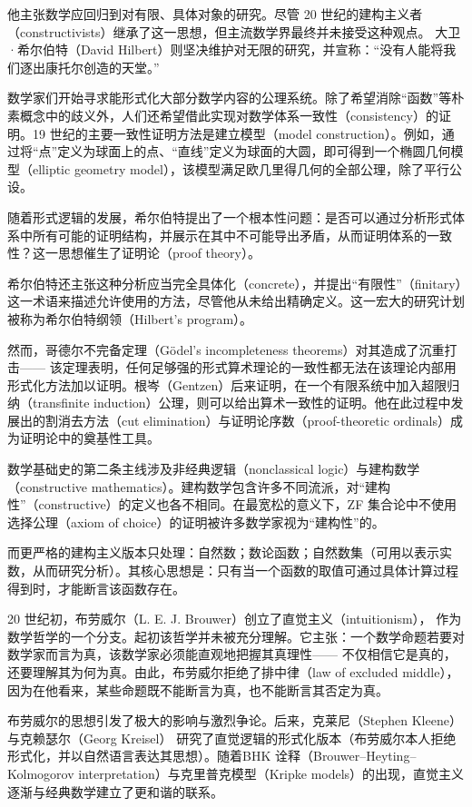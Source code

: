 他主张数学应回归到对有限、具体对象的研究。尽管 20 世纪的建构主义者（constructivists）继承了这一思想，但主流数学界最终并未接受这种观点。  
大卫·希尔伯特（David Hilbert）则坚决维护对无限的研究，并宣称：“没有人能将我们逐出康托尔创造的天堂。”

数学家们开始寻求能形式化大部分数学内容的公理系统。除了希望消除“函数”等朴素概念中的歧义外，人们还希望借此实现对数学体系一致性（consistency）的证明。19 世纪的主要一致性证明方法是建立模型（model construction）。例如，通过将“点”定义为球面上的点、“直线”定义为球面的大圆，即可得到一个椭圆几何模型（elliptic geometry model），该模型满足欧几里得几何的全部公理，除了平行公设。

随着形式逻辑的发展，希尔伯特提出了一个根本性问题：是否可以通过分析形式体系中所有可能的证明结构，并展示在其中不可能导出矛盾，从而证明体系的一致性？这一思想催生了证明论（proof theory）。  

希尔伯特还主张这种分析应当完全具体化（concrete），并提出“有限性”（finitary）这一术语来描述允许使用的方法，尽管他从未给出精确定义。这一宏大的研究计划被称为希尔伯特纲领（Hilbert’s program）。  

然而，哥德尔不完备定理（Gödel’s incompleteness theorems）对其造成了沉重打击—— 该定理表明，任何足够强的形式算术理论的一致性都无法在该理论内部用形式化方法加以证明。根岑（Gentzen）后来证明，在一个有限系统中加入超限归纳（transfinite induction）公理，则可以给出算术一致性的证明。他在此过程中发展出的割消去方法（cut elimination）与证明论序数（proof-theoretic ordinals）成为证明论中的奠基性工具。

数学基础史的第二条主线涉及非经典逻辑（nonclassical logic）与建构数学（constructive mathematics）。建构数学包含许多不同流派，对“建构性”（constructive）的定义也各不相同。在最宽松的意义下，ZF 集合论中不使用选择公理（axiom of choice）的证明被许多数学家视为“建构性”的。  

而更严格的建构主义版本只处理：自然数；数论函数；自然数集（可用以表示实数，从而研究分析）。其核心思想是：只有当一个函数的取值可通过具体计算过程得到时，才能断言该函数存在。

20 世纪初，布劳威尔（L. E. J. Brouwer）创立了直觉主义（intuitionism）， 作为数学哲学的一个分支。起初该哲学并未被充分理解。它主张：一个数学命题若要对数学家而言为真，该数学家必须能直观地把握其真理性—— 不仅相信它是真的，还要理解其为何为真。由此，布劳威尔拒绝了排中律（law of excluded middle），因为在他看来，某些命题既不能断言为真，也不能断言其否定为真。  

布劳威尔的思想引发了极大的影响与激烈争论。后来，克莱尼（Stephen Kleene）与克赖瑟尔（Georg Kreisel）  研究了直觉逻辑的形式化版本（布劳威尔本人拒绝形式化，并以自然语言表达其思想）。随着BHK 诠释（Brouwer–Heyting–Kolmogorov interpretation）与克里普克模型（Kripke models）的出现，直觉主义逐渐与经典数学建立了更和谐的联系。
